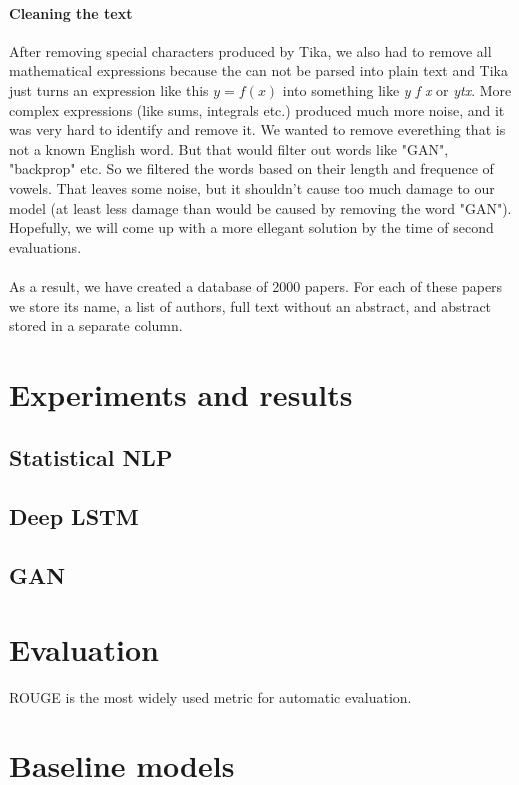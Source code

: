 \documentclass[sigplan]{acmart}
\begin{document}
\paragraph{Cleaning the text} After removing special characters produced by Tika, we also had to remove all mathematical expressions because the can not be parsed into plain text and Tika just turns an expression like this $y = f(x)$ into something like \textit{y f x} or \textit{ytx}. More complex expressions (like sums, integrals etc.) produced much more noise, and it was very hard to identify and remove it. We wanted to remove everething that is not a known English word. But that would filter out words like "GAN", "backprop" etc. So we filtered the words based on their length and frequence of vowels. That leaves some noise, but it shouldn't cause too much damage to our model (at least less damage than would be caused by removing the word "GAN"). Hopefully, we will come up with a more ellegant solution by the time of second evaluations.

\paragraph{} As a result, we have created a database of 2000 papers. For each of these papers we store its name, a list of authors, full text without an abstract, and abstract stored in a separate column.

\section{Experiments and results}
\subsection{Statistical NLP}
\subsection{Deep LSTM}
\subsection{GAN}

\section{Evaluation}

ROUGE is the most widely used metric for automatic evaluation.

\section{Baseline models}
\end{document}
